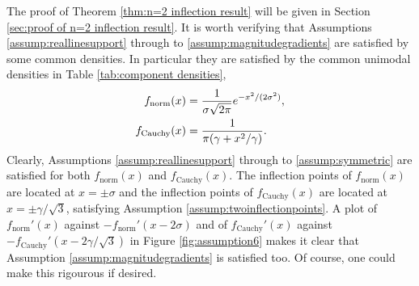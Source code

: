 		The proof of Theorem \ref{thm:n=2 inflection result} will be given in Section \ref{sec:proof of n=2 inflection result}. 
		It is worth verifying that Assumptions \ref{assump:reallinesupport} through to \ref{assump:magnitudegradients} are satisfied by some common densities. In particular they are satisfied by the common unimodal densities in Table \ref{tab:component densities},
		\begin{align}
			f_\mathrm{norm}(x) &= \frac{1}{\sigma\sqrt{2\pi}} e^{-x^2/(2\sigma^2)},\\
			f_\mathrm{Cauchy}(x) &= \frac{1}{\pi (\gamma + x^2/\gamma)}.
		\end{align}
		Clearly, Assumptions \ref{assump:reallinesupport} through to \ref{assump:symmetric} are satisfied for both $f_\mathrm{norm}(x)$ and $f_\mathrm{Cauchy}(x)$.
		The inflection points of $f_\mathrm{norm}(x)$ are located at $x = \pm \sigma$ and the inflection points of $f_\mathrm{Cauchy}(x)$ are located at $x = \pm \gamma/\sqrt{3}$, satisfying Assumption \ref{assump:twoinflectionpoints}. A plot of $f_\mathrm{norm}'(x)$ against $-f_\mathrm{norm}'(x - 2\sigma)$ and of $f_\mathrm{Cauchy}'(x)$ against $-f_\mathrm{Cauchy}'(x - 2\gamma/\sqrt{3})$ in Figure \ref{fig:assumption6} makes it clear that Assumption \ref{assump:magnitudegradients} is satisfied too. Of course, one could make this rigourous if desired.

